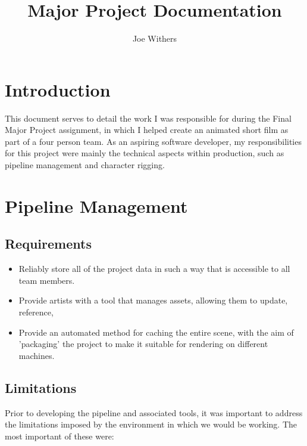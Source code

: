 \documentclass[11pt]{article}
\title{\textbf{Major Project Documentation}}
\author{Joe Withers}
\date{}
\begin{document}
\maketitle

\tableofcontents
\newpage

\section{Introduction}

This document serves to detail the work I was responsible for during the Final Major Project assignment, in which I helped create an animated short film as part of a four person team.
As an aspiring software developer, my responsibilities for this project were mainly the technical aspects within production, such as pipeline management and character rigging.

\section{Pipeline Management}

\subsection{Requirements}

\begin{itemize}

\item Reliably store all of the project data in such a way that is accessible to all team members.

\item Provide artists with a tool that manages assets, allowing them to update, reference,

\item Provide an automated method for caching the entire scene, with the aim of 'packaging' the project to make it suitable for rendering on different machines.

\end{itemize}

\subsection{Limitations}

Prior to developing the pipeline and associated tools, it was important to address the limitations imposed by the environment in which we would be working. The most important of these were:
\end{document}
